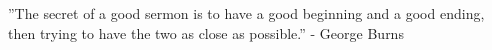 \author{
	Aghiles Djoudi, Rafik Zitouni, Nawel Zangar and Laurent George	\bigskip\\
	\ESIEE\\
	\ECE\\
	Email:   \{aghiles.djoudi, nawel.zangar, laurent.george\}@esiee.fr, rafik.zitouni@ece.fr
}

\epigraph{''The secret of a good sermon is to have a good beginning and a good ending, then trying to have the two as close as possible.'' - George Burns}{}





